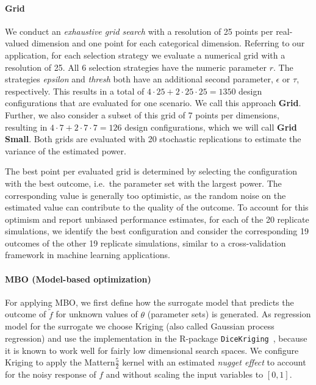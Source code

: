 \documentclass[bimj,fleqn]{w-art}
\theoremstyle{plain}
\theoremstyle{definition}
\begin{document}
\paragraph{Grid}
We conduct an \emph{exhaustive grid search} with a resolution of 25 points per real-valued dimension and one point for each categorical dimension.
Referring to our application, for each selection strategy we evaluate a numerical grid with a resolution of 25.
All 6 selection strategies have the numeric parameter $r$.
The strategies \emph{epsilon} and \emph{thresh} both have an additional second parameter, $\epsilon$ or $\tau$, respectively. 
This results in a total of $4 \cdot 25 + 2 \cdot 25 \cdot 25 = 1350$ design configurations that are evaluated for one scenario.
We call this approach \textbf{Grid}.
Further, we also consider a subset of this grid of 7 points per dimensions, resulting in $4 \cdot 7 + 2 \cdot 7 \cdot 7 = 126$ design configurations, which we will call \textbf{Grid Small}.
Both grids are evaluated with 20 stochastic replications to estimate the variance of the estimated power.

The best point per evaluated grid is determined by selecting the configuration with the best outcome, i.e.\  the parameter set with the largest power.
The corresponding value is generally too optimistic, as the random noise on the estimated value can contribute to the quality of the outcome.
To account for this optimism and report unbiased performance estimates, for each of the 20 replicate simulations, we identify the best configuration and consider the corresponding 19 outcomes of the other 19 replicate simulations, similar to a cross-validation framework in machine learning applications. 

\paragraph{MBO (Model-based optimization)}
For applying MBO, we first define how the surrogate model that predicts the outcome of $\tilde{f}$ for unknown values of $\theta$ (parameter sets) is generated.
As regression model for the surrogate we choose Kriging (also called Gaussian process regression) and use the implementation in the R-package \texttt{DiceKriging}~\citep{roustant_dicekriging_2012}, because it is known to work well for fairly low dimensional search spaces.
We configure Kriging to apply the Mattern$\frac{5}{2}$ kernel with an estimated \emph{nugget effect} to account for the noisy response of $f$ and without scaling the input variables to $[0,1]$.
\end{document}
